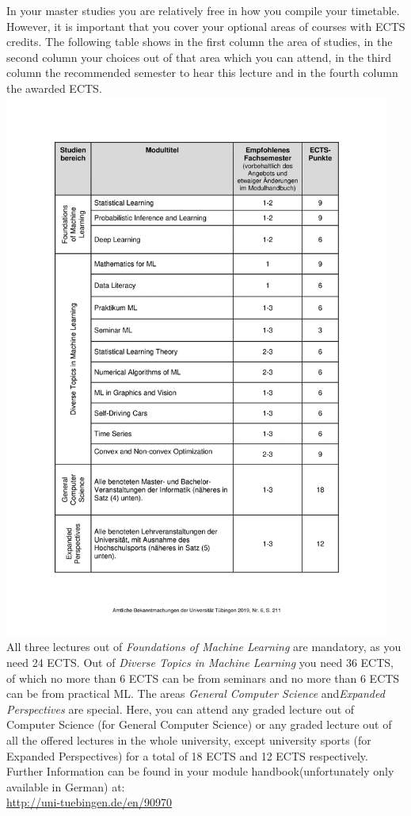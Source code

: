 In your master studies you are relatively free in how you compile your timetable. However, it is important that you cover your optional areas of courses with ECTS credits. The following table shows in the first column the area of studies, in the second column your choices out of that area which you can attend, in the third column the recommended semester to hear this lecture and in the fourth column the awarded ECTS.\\
\includegraphics[height=18cm]{media/ml-msc-uebersicht}~\\
All three lectures out of \emph{Foundations of Machine Learning} are mandatory, as you need 24 ECTS. Out of \emph{Diverse Topics in Machine Learning} you need 36 ECTS, of which no more than 6 ECTS can be from seminars and no more than 6 ECTS can be from practical ML. The areas \emph{General Computer Science} and\emph{Expanded Perspectives} are special. Here, you can attend any graded lecture out of Computer Science (for General Computer Science) or any graded lecture out
of all the offered lectures in the whole university, except university sports (for Expanded Perspectives) for a total of 18 ECTS and 12 ECTS respectively.
Further Information can be found in your module handbook(unfortunately only available in German) at:\\
\url{http://uni-tuebingen.de/en/90970}
